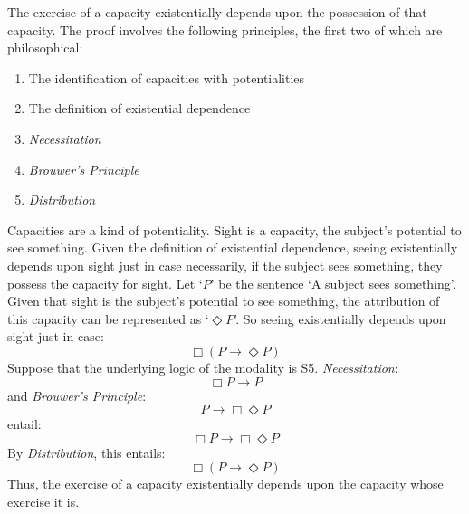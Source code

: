 \documentclass[12pt]{article}
\begin{document}
The exercise of a capacity existentially depends upon the possession of that capacity. The proof involves the following principles, the first two of which are philosophical:
\begin{enumerate}
	\item The identification of capacities with potentialities
	\item The definition of existential dependence
	\item \emph{Necessitation}
	\item \emph{Brouwer's Principle}
	\item \emph{Distribution}
\end{enumerate}
Capacities are a kind of potentiality. Sight is a capacity, the subject's potential to see something. Given the definition of existential dependence, seeing existentially depends upon sight just in case necessarily, if the subject sees something, they possess the capacity for sight. Let `\( P \)' be the sentence `A subject sees something'. Given that sight is the subject's potential to see something, the attribution of this capacity can be represented as `\( \Diamond P \)'. So seeing existentially depends upon sight just in case:
\[
	\Box(P \rightarrow \Diamond P)
\]
Suppose that the underlying logic of the modality is S5. \emph{Necessitation}:
\[
	\Box P \rightarrow P
\]
and \emph{Brouwer's Principle}:
\[
	P \rightarrow \Box \Diamond P
\]
entail:
\[
	\Box P \rightarrow \Box \Diamond P
\]
By \emph{Distribution}, this entails:
\[
	\Box(P \rightarrow \Diamond P)
\]
Thus, the exercise of a capacity existentially depends upon the capacity whose exercise it is.


\pagebreak

 
 
\end{document}

